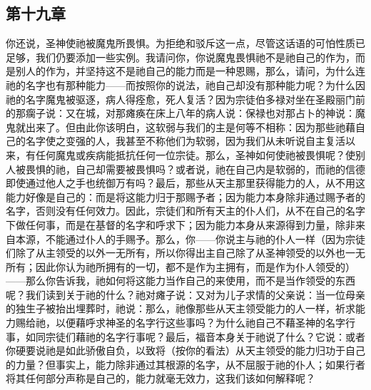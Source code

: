 
\subsection{第十九章}

\par

你还说，圣神使祂被魔鬼所畏惧。为拒绝和驳斥这一点，尽管这话语的可怕性质已足够，我们仍要添加一些实例。我请问你，你说魔鬼畏惧祂不是祂自己的作为，而是别人的作为，并坚持这不是祂自己的能力而是一种恩赐，那么，请问，为什么连祂的名字也有那种能力——而按照你的说法，祂自己却没有那种能力呢？为什么因祂的名字魔鬼被驱逐，病人得痊愈，死人复活？因为宗徒伯多禄对坐在圣殿丽门前的那瘸子说：又在城，对那瘫痪在床上八年的病人说：保禄也对那占卜的神说：魔鬼就出来了。但由此你该明白，这软弱与我们的主是何等不相称：因为那些祂藉自己的名字使之变强的人，我甚至不称他们为软弱，因为我们从未听说自主复活以来，有任何魔鬼或疾病能抵抗任何一位宗徒。那么，圣神如何使祂被畏惧呢？使别人被畏惧的祂，自己却需要被畏惧吗？或者说，祂在自己内是软弱的，而祂的信德即使通过他人之手也统御万有吗？最后，那些从天主那里获得能力的人，从不用这能力好像是自己的：而是将这能力归于那赐予者；因为能力本身除非通过赐予者的名字，否则没有任何效力。因此，宗徒们和所有天主的仆人们，从不在自己的名字下做任何事，而是在基督的名字和呼求下；因为能力本身从来源得到力量，除非来自本源，不能通过仆人的手赐予。那么，你——你说主与祂的仆人一样（因为宗徒们除了从主领受的以外一无所有，所以你得出主自己除了从圣神领受的以外也一无所有；因此你认为祂所拥有的一切，都不是作为主拥有，而是作为仆人领受的）——那么你告诉我，祂如何将这能力当作自己的来使用，而不是当作领受的东西呢？我们读到关于祂的什么？祂对瘫子说：又对为儿子求情的父亲说：当一位母亲的独生子被抬出埋葬时，祂说：那么，祂像那些从天主领受能力的人一样，祈求能力赐给祂，以便藉呼求神圣的名字行这些事吗？为什么祂自己不藉圣神的名字行事，如同宗徒们藉祂的名字行事呢？最后，福音本身关于祂说了什么？它说：或者你硬要说祂是如此骄傲自负，以致将（按你的看法）从天主领受的能力归功于自己的力量？但事实上，能力除非通过其根源的名字，从不屈服于祂的仆人；如果行者将其任何部分声称是自己的，能力就毫无效力，这我们该如何解释呢？\par

